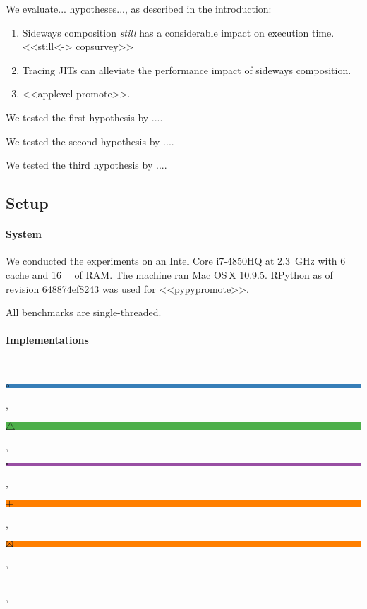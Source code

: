 \documentclass[preprint,english,10pt,nonatbib]{sigplanconf}
\begin{document}
\def\idBox#1#2{%
\setlength{\fboxsep}{1pt}%
\colorbox[HTML]{#1}{\textcolor[gray]{0.9}{\rule[0.1pt]{0pt}{5pt}#2}}%
\xspace}



We evaluate... hypotheses..., as described in the introduction:
\begin{enumerate}
\item Sideways composition \emph{still} has a considerable impact on execution
  time. <<still<-> copsurvey>>
\item Tracing JITs can alleviate the performance impact of sideways composition.
\item <<applevel promote>>.
\end{enumerate}



We tested the first hypothesis by ....

We tested the second hypothesis by ....

We tested the third hypothesis by ....


\subsection{Setup}
\label{sec:setup}


\paragraph{System} We conducted the experiments on %
an Intel Core i7-4850HQ at \SI{2.3}{\GHz} with \SI{6}{\mega\byte} cache and
\SI{16}{\giga\byte} of RAM. The machine ran Mac OS\,X 10.9.5.
%
RPython as of revision
648874ef8243
 was used for <<pypypromote>>.

All benchmarks are single-threaded.


\paragraph{Implementations} %
~\idBox{377EB8}{\(\circ\)}, %
~\idBox{4DAF4A}{\(\bigtriangleup\)}, %
~\idBox{984EA3}{\(\square\)}, %
~\idBox{FF7F00}{\(+\)}, %
~\idBox{FF7F00}{\(\boxtimes\)}, %
~\idBox{E41A1C}{\(\)}, %
\end{document}
